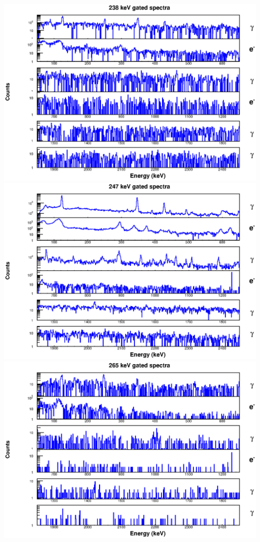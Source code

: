 \includegraphics[scale=0.8]{154Gd_Appendix/238_combined.eps}
\includegraphics[scale=0.8]{154Gd_Appendix/247_combined.eps}
\includegraphics[scale=0.8]{154Gd_Appendix/265_combined.eps}
